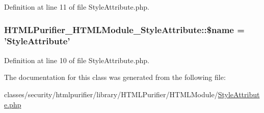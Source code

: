 Definition at line 11 of file Style\+Attribute.\+php.

\hypertarget{classHTMLPurifier__HTMLModule__StyleAttribute_a7b36f1b21eef8336375d7a055828d63c}{
\subsubsection[{\$name}]{\setlength{\rightskip}{0pt plus 5cm}H\+T\+M\+L\+Purifier\+\_\+\+H\+T\+M\+L\+Module\+\_\+\+Style\+Attribute\+::\$name = 'Style\+Attribute'}}\label{classHTMLPurifier__HTMLModule__StyleAttribute_a7b36f1b21eef8336375d7a055828d63c}


Definition at line 10 of file Style\+Attribute.\+php.



The documentation for this class was generated from the following file\+:\begin{DoxyCompactItemize}
\item 
classes/security/htmlpurifier/library/\+H\+T\+M\+L\+Purifier/\+H\+T\+M\+L\+Module/\hyperlink{StyleAttribute_8php}{Style\+Attribute.\+php}\end{DoxyCompactItemize}
